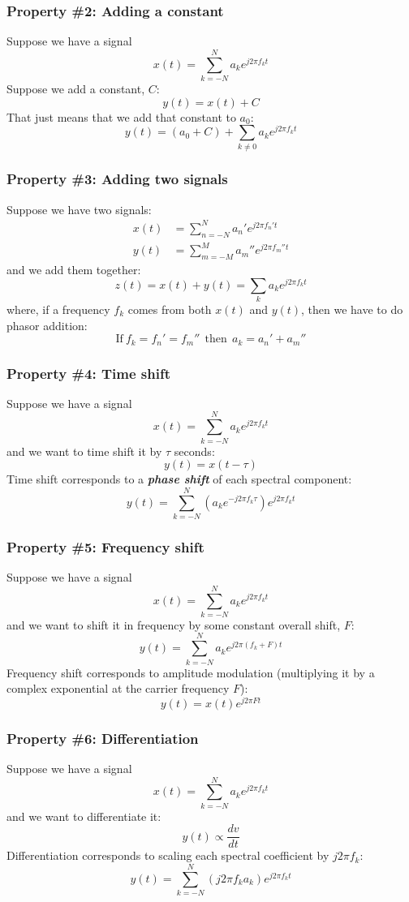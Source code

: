 \documentclass{beamer}
\begin{document}
\begin{frame}
  \frametitle{Property \#2: Adding a constant}

  Suppose we have a signal
  \[
  x(t) = \sum_{k=-N}^N a_ke^{j2\pi f_kt}
  \]
  Suppose we add a constant, $C$:
  \[
  y(t) = x(t) + C
  \]
  That just means that we add that constant to $a_0$:
  \[
  y(t)  = (a_0+C) + \sum_{k\ne 0} a_k e^{j2\pi f_kt}
  \]
\end{frame}

\begin{frame}
  \frametitle{Property \#3: Adding two signals}

  Suppose we have two signals:
  \begin{align*}
    x(t) &= \sum_{n=-N}^N a_n'e^{j2\pi f_n't}\\
    y(t) &= \sum_{m=-M}^M a_m''e^{j2\pi f_m''t}
  \end{align*}
  and we add them together:
  \[
  z(t) = x(t) + y(t) = \sum_k a_ke^{j2\pi f_kt}
  \]
  where, if a frequency $f_k$ comes from both $x(t)$ and $y(t)$, then
  we have to do phasor addition:
  \[
  \mbox{If}~f_k=f_n'=f_m''~~\mbox{then}~~a_k=a_n'+a_m''
  \]
\end{frame}

\begin{frame}
  \frametitle{Property \#4: Time shift}

  Suppose we have a signal
  \[
  x(t) = \sum_{k=-N}^N a_ke^{j2\pi f_kt}
  \]
  and we want to time shift it by $\tau$ seconds:
  \[
  y(t) = x(t-\tau)
  \]
  Time shift corresponds to a {\em\bf phase shift} of each spectral component:
  \[
  y(t) = \sum_{k=-N}^N \left(a_ke^{-j2\pi f_k\tau}\right)e^{j2\pi f_kt}
  \]
\end{frame}

\begin{frame}
  \frametitle{Property \#5: Frequency shift}

  Suppose we have a signal
  \[
  x(t) = \sum_{k=-N}^N a_ke^{j2\pi f_kt}
  \]
  and we want to shift it in frequency by some constant overall shift, $F$:
  \[
  y(t) = \sum_{k=-N}^N a_ke^{j2\pi \left(f_k+F\right)t}
  \]
  Frequency shift corresponds to amplitude modulation (multiplying it by a
  complex exponential at the carrier frequency $F$):
  \[
  y(t) = x(t) e^{j2\pi Ft}
  \]
\end{frame}

\begin{frame}
  \frametitle{Property \#6: Differentiation}

  Suppose we have a signal
  \[
  x(t) = \sum_{k=-N}^N a_ke^{j2\pi f_kt}
  \]
  and we want to differentiate it:
  \[
  y(t) \propto \frac{dv}{dt}
  \]
  Differentiation corresponds to scaling each spectral coefficient by
  $j2\pi f_k$:
  \[
  y(t) = \sum_{k=-N}^N \left(j2\pi f_k a_k\right)e^{j2\pi f_kt}
  \]
\end{frame}
\end{document}
